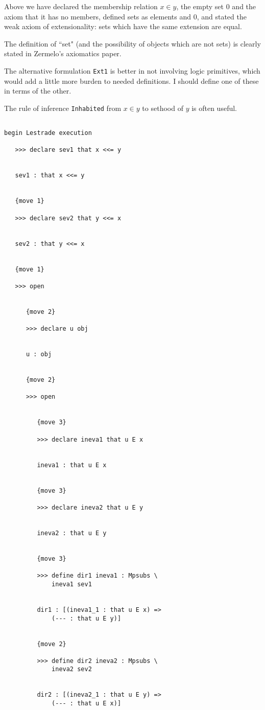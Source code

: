 \documentclass[12pt]{article}
\begin{document}
Above we have declared the membership relation $x \in y$, the empty set 0 and the axiom that it has no members, defined sets as elements and 0, and stated the weak axiom of extensionality:  sets which have the same extension are equal.

The definition of ``set" (and the possibility of objects which are not sets) is clearly stated in Zermelo's axiomatics paper.

The alternative formulation {\tt Ext1} is better in not involving logic primitives, which would add a little more burden to needed definitions.  I should define one of these in terms of the other.

The  rule of inference {\tt Inhabited} from $x \in y$ to sethood of $y$ is often useful.

\begin{verbatim}

begin Lestrade execution

   >>> declare sev1 that x <<= y


   sev1 : that x <<= y


   {move 1}

   >>> declare sev2 that y <<= x


   sev2 : that y <<= x


   {move 1}

   >>> open


      {move 2}

      >>> declare u obj


      u : obj


      {move 2}

      >>> open


         {move 3}

         >>> declare ineva1 that u E x


         ineva1 : that u E x


         {move 3}

         >>> declare ineva2 that u E y


         ineva2 : that u E y


         {move 3}

         >>> define dir1 ineva1 : Mpsubs \
             ineva1 sev1


         dir1 : [(ineva1_1 : that u E x) => 
             (--- : that u E y)]


         {move 2}

         >>> define dir2 ineva2 : Mpsubs \
             ineva2 sev2


         dir2 : [(ineva2_1 : that u E y) => 
             (--- : that u E x)]



\end{verbatim}
\end{document}
